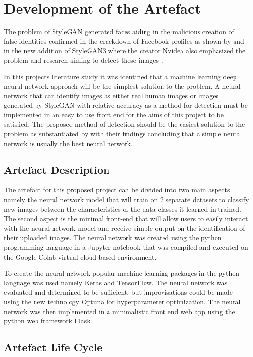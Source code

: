 \chapter{Development of the Artefact}\label{ch3}

The problem of StyleGAN generated faces aiding in the malicious creation of false identities confirmed in the crackdown of Facebook profiles as shown by \cite{Chandler2016} and in the new addition of StyleGAN3 where the creator Nvidea also emphasized the problem and research aiming to detect these images \citep{Karras2021}.

In this projects literature study it was identified that a machine learning deep neural network approach will be the simplest solution to the problem. A neural network that can identify images as either real human images or images generated by StyleGAN with relative accuracy as a method for detection must be implemented in an easy to use front end for the aims of this project to be satisfied. The proposed method of detection should be the easiest solution to the problem as substantiated by \cite{rasmussen2001} with their findings concluding that a simple neural network is usually the best neural network.

\section{Artefact Description}

The artefact for this proposed project can be divided into two main aspects namely the neural network model that will train on 2 separate datasets to classify new images between the characteristics of the data classes it learned in trained. The second aspect is the minimal front-end that will allow users to easily interact with the neural network model and receive simple output on the identification of their uploaded images. The neural network was created using the python programming language in a Jupyter notebook that was compiled and executed on the Google Colab virtual cloud-based environment. 

To create the neural network popular machine learning packages in the python language was used namely Keras and TensorFlow. The neural network was evaluated and determined to be sufficient, but improvisations could be made using the new technology Optuna for hyperparameter optimization. The neural network was then implemented in a minimalistic front end web app using the python web framework Flask.

\section{Artefact Life Cycle}

